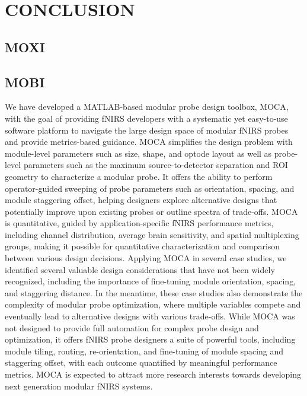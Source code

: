 \chapter{CONCLUSION} %
\label{chap:conclusion}

\section{MOXI}

\section{MOBI}
We have developed a MATLAB-based modular probe design toolbox, \ac{MOCA}, with the goal of providing \ac{fNIRS} developers with a systematic yet easy-to-use software platform to navigate the large design space of modular \ac{fNIRS} probes and provide metrics-based guidance. \ac{MOCA} simplifies the design problem with module-level parameters such as size, shape, and optode layout as well as probe-level parameters such as the maximum source-to-detector separation and ROI geometry to characterize a modular probe. It offers the ability to perform operator-guided sweeping of probe parameters such as orientation, spacing, and module staggering offset, helping designers explore alternative designs that potentially improve upon existing probes or outline spectra of trade-offs. \ac{MOCA} is quantitative, guided by application-specific \ac{fNIRS} performance metrics, including channel distribution, average brain sensitivity, and spatial multiplexing groups, making it possible for quantitative characterization and comparison between various design decisions. Applying \ac{MOCA} in several case studies, we identified several valuable design considerations that have not been widely recognized, including the importance of fine-tuning module orientation, spacing, and staggering distance. In the meantime, these case studies also demonstrate the complexity of modular probe optimization, where multiple variables compete and eventually lead to alternative designs with various trade-offs. While \ac{MOCA} was not designed to provide full automation for complex probe design and optimization, it offers \ac{fNIRS} probe designers a suite of powerful tools, including module tiling, routing, re-orientation, and fine-tuning of module spacing and staggering offset, with each outcome quantified by meaningful performance metrics. \ac{MOCA} is expected to attract more research interests towards developing next generation modular \ac{fNIRS} systems.


